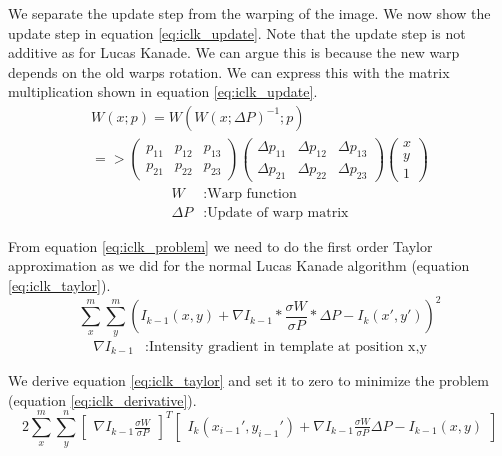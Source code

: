 \documentclass[11pt,a4paper,titlepage,oneside]{report}
\begin{document}
We separate the update step from the warping of the image. We now show the update step in equation \ref{eq:iclk_update}. Note that the update step is not additive as for Lucas Kanade. We can argue this is because the new warp depends on the old warps rotation. We can express this with the matrix multiplication shown in equation \ref{eq:iclk_update}.
\begin{equation}\label{eq:iclk_update}
  \begin{gathered}
    W(x;p)=W(W(x;\Delta P)^{-1}; p)\\
    =>
    \begin{pmatrix}
    p_{11} & p_{12} & p_{13} \\
    p_{21} & p_{22} & p_{23}
    \end{pmatrix}
    \begin{pmatrix}
      \Delta p_{11} & \Delta p_{12} & \Delta p_{13} \\
      \Delta p_{21} & \Delta p_{22} & \Delta p_{23}
    \end{pmatrix}
    \begin{pmatrix}
      x\\
      y\\
      1
    \end{pmatrix}
  \end{gathered}
\end{equation}
\begin{align*}
  W               &: \text{Warp function}\\
  \Delta P        &: \text{Update of warp matrix}
\end{align*}

From equation \ref{eq:iclk_problem} we need to do the first order Taylor approximation as we did for the normal Lucas Kanade algorithm (equation \ref{eq:iclk_taylor}).
\begin{equation}\label{eq:iclk_taylor}
  \sum_x^m\sum_y^m(I_{k-1}(x,y)+\nabla I_{k-1}*\frac{\sigma W}{\sigma P}*\Delta P-I_{k}(x',y'))^2
\end{equation}
\begin{align*}
  \nabla I_{k-1}  &:  \text{Intensity gradient in template at position x,y}
\end{align*}

We derive equation \ref{eq:iclk_taylor} and set it to zero to minimize the problem (equation \ref{eq:iclk_derivative}).
\begin{equation}\label{eq:iclk_derivative}
  2\sum_x^m\sum_y^n\begin{bmatrix}\nabla I_{k-1}\frac{\sigma W}{\sigma P}\end{bmatrix}^T\begin{bmatrix}I_{k}(x_{i-1}',y_{i-1}')+\nabla I_{k-1}\frac{\sigma W}{\sigma P}\Delta P-I_{k-1}(x,y)\end{bmatrix}
\end{equation}
\end{document}
